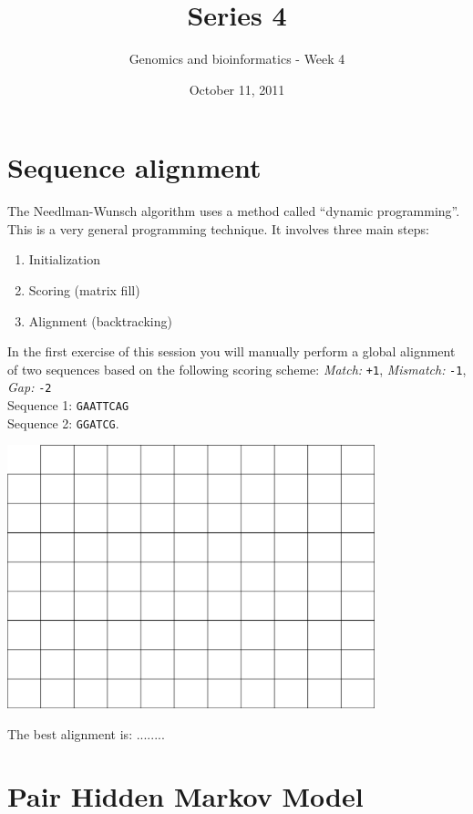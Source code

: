 \documentclass[a4paper,11pt]{article}
\title{Series 4}
\date{October 11, 2011}
\author{Genomics and bioinformatics - Week 4}
\begin{document}
\maketitle




\section{Sequence alignment}
The Needlman-Wunsch algorithm uses a method called ``dynamic programming''. This is a very general programming technique. It involves three main steps:
\begin{enumerate}
\item Initialization
\item Scoring (matrix fill)
\item Alignment (backtracking)
\end{enumerate}
In the first exercise of this session you will manually perform a global alignment of two sequences based on the following scoring scheme:
\emph{Match:} \texttt{+1}, \emph{Mismatch:} \texttt{-1}, \emph{Gap:} \texttt{-2}\\
Sequence 1: \texttt{GAATTCAG}\\
Sequence 2: \texttt{GGATCG}.
\vspace{0.5cm}
\begin{center}
\includegraphics[width=0.8\textwidth]{matrix.png}
\end{center}
\vspace{0.5cm}

The best alignment is: ........\\

 
\section{Pair Hidden Markov Model}
\end{document}
